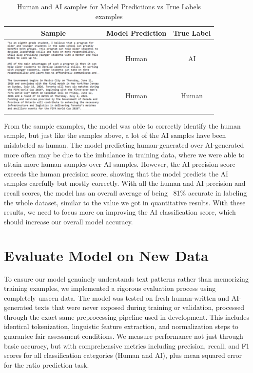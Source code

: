 \documentclass{article} %
\begin{document}
\begin{table}[H]
\centering
\caption{Human and AI samples for Model Predictions vs True Labels examples}
\begin{tabular}{|c|c|c|}
\hline
\textbf{Sample} & \textbf{Model Prediction} & \textbf{True Label} \\
\hline
\includegraphics[width=5cm]{sample1.png} & Human & AI \\
\hline
\includegraphics[width=5cm]{sample2.png} & Human & Human \\
\hline
\end{tabular}
\end{table}

From the sample examples, the model was able to correctly identify the human sample, but just like the samples above, a lot of the AI samples have been mislabeled as human. The model predicting human-generated over AI-generated more often may be due to the imbalance in training data, where we were able to attain more human samples over AI samples. However, the AI precision score exceeds the human precision score, showing that the model predicts the AI samples carefully but mostly correctly. With all the human and AI precision and recall scores, the model has an overall average of being ~81\% accurate in labeling the whole dataset, similar to the value we got in quantitative results. With these results, we need to focus more on improving the AI classification score, which should increase our overall model accuracy.


\section{Evaluate Model on New Data}
To ensure our model genuinely understands text patterns rather than memorizing training examples, we implemented a rigorous evaluation process using completely unseen data. The model was tested on fresh human-written and AI-generated texts that were never exposed during training or validation, processed through the exact same preprocessing pipeline used in development. This includes identical tokenization, linguistic feature extraction, and normalization steps to guarantee fair assessment conditions. We measure performance not just through basic accuracy, but with comprehensive metrics including precision, recall, and F1 scores for all classification categories (Human and AI), plus mean squared error for the ratio prediction task.
\end{document}
